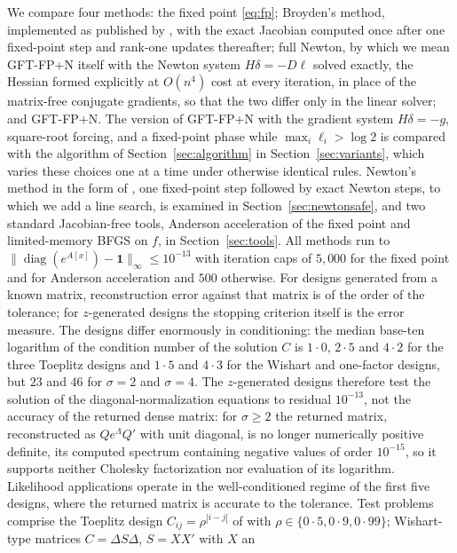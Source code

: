\documentclass[11pt]{article}
\newcommand{\diag}{\operatorname{diag}}
\newcommand{\one}{\mathbf{1}}
\begin{document}
We compare four methods: the fixed point \eqref{eq:fp}; Broyden's
method, implemented as published by \citet{ChenFeiYu:2025}, with the
exact Jacobian computed once after one fixed-point step and rank-one
updates thereafter; full Newton, by which we mean GFT-FP+N itself
with the Newton system $H\delta=-D\ell$ solved exactly, the Hessian
formed explicitly at $O(n^{4})$ cost at every iteration, in place of
the matrix-free conjugate gradients, so that the two differ only in
the linear solver; and GFT-FP+N. The version of GFT-FP+N with the
gradient system $H\delta=-g$, square-root forcing, and a fixed-point
phase while $\max_i\ell_i>\log2$ is compared with the algorithm of
Section~\ref{sec:algorithm} in Section~\ref{sec:variants}, which
varies these choices one at a time under otherwise identical rules.
Newton's method in the form of
\citet{ChenFeiYu:2025}, one fixed-point step followed by exact Newton
steps, to which we add a line search, is examined in
Section~\ref{sec:newtonsafe}, and two standard
Jacobian-free tools, Anderson acceleration of the fixed point and
limited-memory BFGS on $f$, in Section~\ref{sec:tools}. All methods run to
$\|\diag(e^{A[x]})-\one\|_{\infty}\leq10^{-13}$ with iteration caps of
$5{,}000$ for the fixed point and for Anderson acceleration and $500$
otherwise. For designs
generated from a known matrix, reconstruction error against that
matrix is of the order of the tolerance; for $z$-generated designs the
stopping criterion itself is the error measure. The designs differ
enormously in conditioning: the median base-ten logarithm of the
condition number of the solution $C$ is $1{\cdot}0$, $2{\cdot}5$ and
$4{\cdot}2$ for the three Toeplitz designs and $1{\cdot}5$ and
$4{\cdot}3$ for the Wishart and one-factor designs, but $23$ and $46$
for $\sigma=2$ and $\sigma=4$. The $z$-generated designs therefore test
the solution of the diagonal-normalization equations to residual
$10^{-13}$, not the accuracy of the returned dense matrix: for
$\sigma\geq2$ the returned matrix, reconstructed as $Qe^{\Lambda}Q'$
with unit diagonal, is no longer numerically positive definite, its
computed spectrum containing negative values of order $10^{-15}$, so
it supports neither Cholesky factorization nor evaluation of its
logarithm. Likelihood applications operate in the
well-conditioned regime of the first five designs, where the returned
matrix is accurate to the tolerance. Test
problems comprise the Toeplitz design $C_{ij}=\rho^{|i-j|}$ of
\citet{ChenFeiYu:2025} with $\rho\in\{0{\cdot}5,0{\cdot}9,0{\cdot}99\}$;
Wishart-type matrices $C=\Delta S\Delta$, $S=XX'$ with $X$ an
\end{document}
